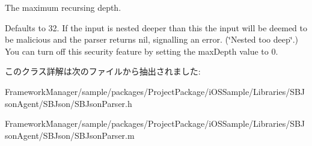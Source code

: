 The maximum recursing depth. 

Defaults to 32. If the input is nested deeper than this the input will be deemed to be malicious and the parser returns nil, signalling an error. (\char`\"{}\+Nested too deep\char`\"{}.) You can turn off this security feature by setting the max\+Depth value to 0. 

このクラス詳解は次のファイルから抽出されました\+:\begin{DoxyCompactItemize}
\item 
Framework\+Manager/sample/packages/\+Project\+Package/i\+O\+S\+Sample/\+Libraries/\+S\+B\+Json\+Agent/\+S\+B\+Json/S\+B\+Json\+Parser.\+h\item 
Framework\+Manager/sample/packages/\+Project\+Package/i\+O\+S\+Sample/\+Libraries/\+S\+B\+Json\+Agent/\+S\+B\+Json/S\+B\+Json\+Parser.\+m\end{DoxyCompactItemize}
